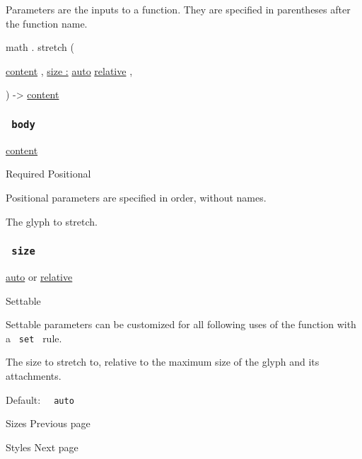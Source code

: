 \label{parameters-tooltip}
Parameters are the inputs to a function. They are specified in
parentheses after the function name.

math { . } { stretch } (

{ \href{/docs/reference/foundations/content/}{content} , } {
\hyperref[parameters-size]{size :}
\href{/docs/reference/foundations/auto/}{auto}
\href{/docs/reference/layout/relative/}{relative} , }

) -\textgreater{} \href{/docs/reference/foundations/content/}{content}

\subsubsection{\texorpdfstring{\texttt{\ body\ }}{ body }}\label{parameters-body}

\href{/docs/reference/foundations/content/}{content}

{Required} {{ Positional }}

\label{parameters-body-positional-tooltip}
Positional parameters are specified in order, without names.

The glyph to stretch.

\subsubsection{\texorpdfstring{\texttt{\ size\ }}{ size }}\label{parameters-size}

\href{/docs/reference/foundations/auto/}{auto} {or}
\href{/docs/reference/layout/relative/}{relative}

{{ Settable }}

\label{parameters-size-settable-tooltip}
Settable parameters can be customized for all following uses of the
function with a \texttt{\ set\ } rule.

The size to stretch to, relative to the maximum size of the glyph and
its attachments.

Default: \texttt{\ }{\texttt{\ auto\ }}\texttt{\ }

\href{/docs/reference/math/sizes/}{\pandocbounded{}}

{ Sizes } { Previous page }

\href{/docs/reference/math/styles/}{\pandocbounded{}}

{ Styles } { Next page }


